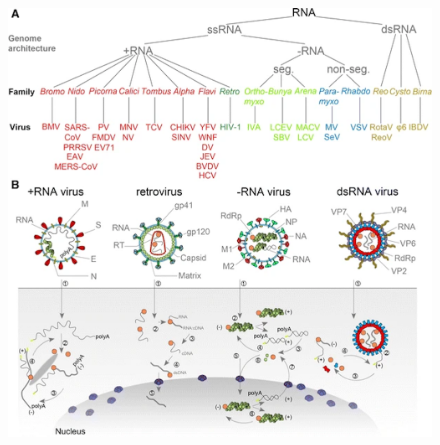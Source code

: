 \begin{figure}

{\centering \includegraphics[width=0.7\linewidth]{./figures/bacteria/rna_virus} 

}


\end{figure}
